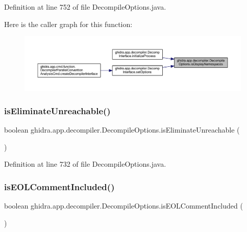 Definition at line 752 of file Decompile\+Options.\+java.

Here is the caller graph for this function\+:
\nopagebreak
\begin{figure}[H]
\begin{center}
\leavevmode
\includegraphics[width=350pt]{classghidra_1_1app_1_1decompiler_1_1_decompile_options_a12283b5df1965867ba288f1ba6241a6f_icgraph}
\end{center}
\end{figure}
\mbox{\label{classghidra_1_1app_1_1decompiler_1_1_decompile_options_a76d3f9af039f7fc03e9dd3bb1418d118}} 
\subsubsection{\texorpdfstring{isEliminateUnreachable()}{isEliminateUnreachable()}}
{\footnotesize\ttfamily boolean ghidra.\+app.\+decompiler.\+Decompile\+Options.\+is\+Eliminate\+Unreachable (\begin{DoxyParamCaption}{ }\end{DoxyParamCaption})\hspace{0.3cm}{\ttfamily [inline]}}



Definition at line 732 of file Decompile\+Options.\+java.

\mbox{\label{classghidra_1_1app_1_1decompiler_1_1_decompile_options_a75d81c5385c82ca1fcb52293f92072e3}} 
\subsubsection{\texorpdfstring{isEOLCommentIncluded()}{isEOLCommentIncluded()}}
{\footnotesize\ttfamily boolean ghidra.\+app.\+decompiler.\+Decompile\+Options.\+is\+E\+O\+L\+Comment\+Included (\begin{DoxyParamCaption}{ }\end{DoxyParamCaption})\hspace{0.3cm}{\ttfamily [inline]}}



